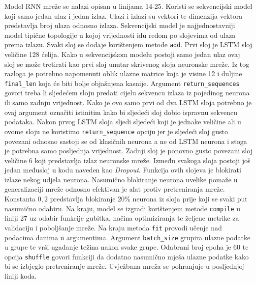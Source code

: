 \documentclass[times, utf8, diplomski]{fer}
\begin{document}
Model RNN mreže se nalazi opisan u linijama 14-25. Koristi se sekvencijski model koji samo jedan
ulaz i jedan izlaz. Ulazi i izlazi su vektori te dimenzija vektora predstavlja broj ulaza odnosno izlaza.
Sekvencijski model je najjednostavniji model tipične topologije u kojoj vrijednosti idu redom po slojevima
od ulaza prema izlazu. Svaki sloj se dodaje korištenjem metode \texttt{add}. Prvi sloj je LSTM sloj veličine
128 ćelija. Kako u sekvencijskom modelu postoji samo jedan ulaz ovaj sloj se može tretirati kao prvi sloj
unutar skrivenog sloja neuronske mreže. Iz tog razloga je potrebno napomenuti oblik ulazne matrice koja je
visine 12 i duljine \texttt{final\_len} koja će biti bolje objašnjena kasnije. Argument \texttt{return\_sequences}
govori treba li sljedećem sloju predati cijelu sekvencu izlaza iz pojedinog neurona ili samo zadnju vrijednost.
Kako je ovo samo prvi od dva LSTM sloja potrebno je ovaj argument označiti istinitim kako bi sljedeći sloj
dobio ispravnu sekvencu podataka. Nakon prvog LSTM sloja sljedi sljedeći koji je jednake veličine ali u ovome
sloju ne koristimo \texttt{return\_sequence} opciju jer je sljedeći sloj gusto povezani odnosno sastoji se od
klasičnih neurona a ne od LSTM neurona i stoga je potrebna samo posljednja vrijednost. Zadnji sloj je ponovno
gusto povezani sloj veličine 6 koji predstavlja izlaz neuronske mreže. Između svakoga sloja postoji još jedan
međusloj u kodu naveden kao \textit{Dropout}. Funkcija ovih slojeva je blokirati izlaze nekog udjela neurona.
Nasumično blokiranje neurona uvelike pomaže u generalizaciji mreže odnosno efektivan je alat protiv pretreniranja
mreže. Konstanta $0,2$ predstavlja blokiranje 20\% neurona iz sloja prije koji se svaki put nasumično odabiru. Na kraju,
model se izgradi korištenjem metode \texttt{compile} u liniji 27 uz odabir funkcije gubitka, načina optimiziranja
te željene metrike za validaciju i poboljšanje mreže. Na kraju metoda \texttt{fit} provodi učenje nad podacima
danima u argumentima. Argument \texttt{batch\_size} grupira ulazne podatke u grupe te vrši ugađanje težina
nakon svake grupe. Odabrani broj epoha je 60 te opcija \texttt{shuffle} govori funkciji da
dodatno nasumično mješa ulazne podatke
kako bi se izbjeglo pretreniranje mreže. Uvježbana mreža se pohranjuje u posljednjoj liniji koda.
\end{document}
